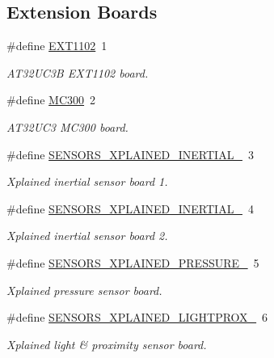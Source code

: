 \subsection*{Extension Boards}
\begin{DoxyCompactItemize}
\item 
\#define \mbox{\hyperlink{group__group__common__boards_gac0e7416ec00004a707cf2d27ad58cb3d}{E\+X\+T1102}}~1
\begin{DoxyCompactList}\small\item\em A\+T32\+U\+C3B E\+X\+T1102 board. \end{DoxyCompactList}\item 
\#define \mbox{\hyperlink{group__group__common__boards_gace61944bcb2fb68401c2706a769fd03e}{M\+C300}}~2
\begin{DoxyCompactList}\small\item\em A\+T32\+U\+C3 M\+C300 board. \end{DoxyCompactList}\item 
\#define \mbox{\hyperlink{group__group__common__boards_gab00de293d88d2d5b7abbd20fabf3640b}{S\+E\+N\+S\+O\+R\+S\+\_\+\+X\+P\+L\+A\+I\+N\+E\+D\+\_\+\+I\+N\+E\+R\+T\+I\+A\+L\+\_}}~3
\begin{DoxyCompactList}\small\item\em Xplained inertial sensor board 1. \end{DoxyCompactList}\item 
\#define \mbox{\hyperlink{group__group__common__boards_gaa9549edc14a78c1600acf49e44b9c5ac}{S\+E\+N\+S\+O\+R\+S\+\_\+\+X\+P\+L\+A\+I\+N\+E\+D\+\_\+\+I\+N\+E\+R\+T\+I\+A\+L\+\_}}~4
\begin{DoxyCompactList}\small\item\em Xplained inertial sensor board 2. \end{DoxyCompactList}\item 
\#define \mbox{\hyperlink{group__group__common__boards_ga6d24ad0b78a00ebea03fc2b263e0735b}{S\+E\+N\+S\+O\+R\+S\+\_\+\+X\+P\+L\+A\+I\+N\+E\+D\+\_\+\+P\+R\+E\+S\+S\+U\+R\+E\+\_}}~5
\begin{DoxyCompactList}\small\item\em Xplained pressure sensor board. \end{DoxyCompactList}\item 
\#define \mbox{\hyperlink{group__group__common__boards_ga0a1006037bf18d016accfdea4a1105ae}{S\+E\+N\+S\+O\+R\+S\+\_\+\+X\+P\+L\+A\+I\+N\+E\+D\+\_\+\+L\+I\+G\+H\+T\+P\+R\+O\+X\+\_}}~6
\begin{DoxyCompactList}\small\item\em Xplained light \& proximity sensor board. \end{DoxyCompactList}\item 

\end{DoxyCompactItemize}
